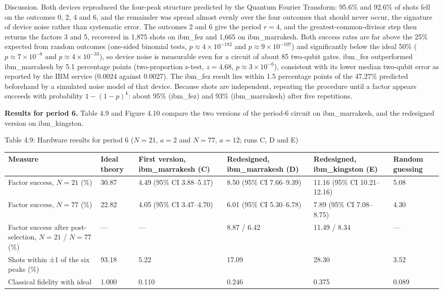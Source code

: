 \documentclass[12pt,oneside]{report}
\begin{document}
Discussion. Both devices reproduced the four-peak structure predicted by the Quantum Fourier Transform: 95.6\% and 92.6\% of shots fell on the outcomes 0, 2, 4 and 6, and the remainder was spread almost evenly over the four outcomes that should never occur, the signature of device noise rather than systematic error. The outcomes 2 and 6 give the period $r = 4$, and the greatest-common-divisor step then returns the factors 3 and 5, recovered in 1,875 shots on ibm\_fez and 1,665 on ibm\_marrakesh. Both success rates are far above the 25\% expected from random outcomes (one-sided binomial tests, $p \approx 4 \times 10^{-182}$ and $p \approx 9 \times 10^{-107}$) and significantly below the ideal 50\% ($p \approx 7 \times 10^{-8}$ and $p \approx 4 \times 10^{-33}$), so device noise is measurable even for a circuit of about 85 two-qubit gates. ibm\_fez outperformed ibm\_marrakesh by 5.1 percentage points (two-proportion z-test, $z = 4.68$, $p \approx 3 \times 10^{-6}$), consistent with its lower median two-qubit error as reported by the IBM service (0.0024 against 0.0027). The ibm\_fez result lies within 1.5 percentage points of the 47.27\% predicted beforehand by a simulated noise model of that device. Because shots are independent, repeating the procedure until a factor appears succeeds with probability $1 - (1 - p)^{k}$: about 95\% (ibm\_fez) and 93\% (ibm\_marrakesh) after five repetitions.
\par

\textbf{Results for period 6.} Table 4.9 and Figure 4.10 compare the two versions of the period-6 circuit on ibm\_marrakesh, and the redesigned version on ibm\_kingston.
\par

\label{tab:4.9}Table 4.9: Hardware results for period 6 ($N = 21$, $a = 2$ and $N = 77$, $a = 12$; runs C, D and E)
\par

\begin{center}\small\begin{tabularx}{\textwidth}{|W|W|W|W|W|W|}\hline
Measure & Ideal theory & First version, ibm\_marrakesh (C) & Redesigned, ibm\_marrakesh (D) & Redesigned, ibm\_kingston (E) & Random guessing \\\hline
Factor success, $N = 21$ (\%) & 30.87 & 4.49 (95\% CI 3.88–5.17) & 8.50 (95\% CI 7.66–9.39) & 11.16 (95\% CI 10.21–12.16) & 5.08 \\\hline
Factor success, $N = 77$ (\%) & 22.82 & 4.05 (95\% CI 3.47–4.70) & 6.01 (95\% CI 5.30–6.78) & 7.89 (95\% CI 7.08–8.75) & 4.30 \\\hline
Factor success after post-selection, $N = 21$ / $N = 77$ (\%) & — & — & 8.87 / 6.42 & 11.49 / 8.34 & — \\\hline
Shots within ±1 of the six peaks (\%) & 93.18 & 5.22 & 17.09 & 28.30 & 3.52 \\\hline
Classical fidelity with ideal & 1.000 & 0.110 & 0.246 & 0.375 & 0.089 \\\hline\end{tabularx}\end{center}
\end{document}

